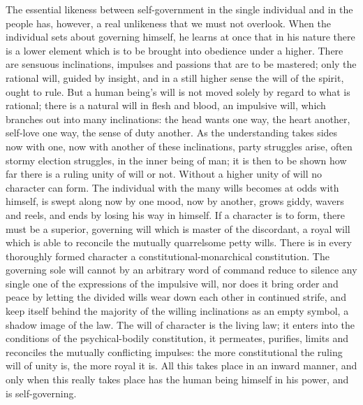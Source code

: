 \documentclass[12pt,a4paper,openany]{book}
\newcommand{\opage}[1]{\marginnote{\footnotesize\textit{[#1]}}}
\begin{document}
\setcounter{footnote}{0}%
\opage{20}The essential likeness between self-government in the
single individual and in the people has, however, a real
unlikeness that we must not overlook. When the individual
sets about governing himself, he learns at once that in
his nature there is a lower element which is to be brought
into obedience under a higher. There are sensuous inclinations,
impulses and passions that are to be
mastered; only the rational will, guided by insight, and in
a still higher sense the will of the spirit, ought to rule. But
a human being's will is not moved solely by regard to
what is rational; there is a natural will in flesh and blood,
an impulsive will, which branches out into many inclinations:
the head wants one way, the heart another, self-love
one way, the sense of duty another. As the understanding takes
sides now with one, now with another of these
inclinations, party struggles arise, often stormy
election struggles, in the inner being of man; it is then to be shown
how far there is a ruling unity of will or not.
Without a higher unity of will no character
can form. The individual with the many wills becomes
at odds with himself, is swept along now by one mood,
now by another, grows giddy, wavers and reels, and
ends by losing his way in himself. If a character is to
form, there must be a superior, governing
will which is master of the discordant, a royal
will which is able to reconcile the mutually quarrelsome
petty wills. There is in every thoroughly formed
character a constitutional-monarchical constitution.
The governing sole will cannot by an arbitrary
word of command reduce to silence any single one of the
expressions of the impulsive will, nor does it bring order
and peace by letting the divided wills wear down each
\setcounter{footnote}{0}%
\opage{21}other in continued strife, and keep itself behind the majority
of the willing inclinations as an empty symbol, a shadow
image of the law. The will of character is the living law;
it enters into the conditions of the psychical-bodily constitution,
it permeates, purifies, limits and
reconciles the mutually conflicting impulses: the more
constitutional the ruling will of unity is, the
more royal it is. All this takes place in an inward
manner, and only when this really takes place has the human being
himself in his power, and is self-governing.
\end{document}
